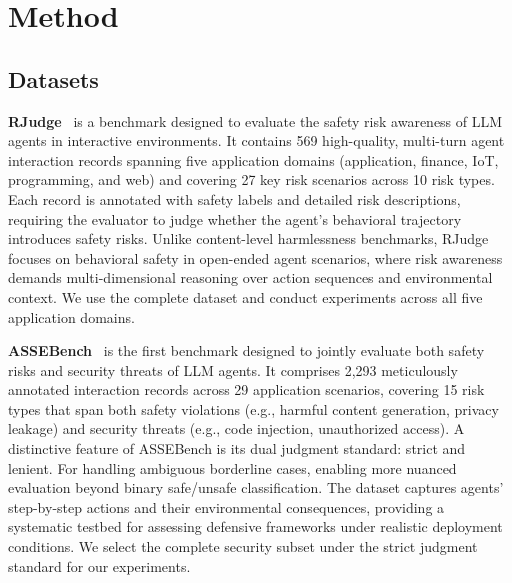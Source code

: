 \section{Method}
  \label{sec:method}
  \subsection{Datasets}
  \label{sec:datasets}
  \textbf{RJudge}~\citep{yuan2024rjudge} is a benchmark designed to evaluate the safety risk awareness of LLM agents in interactive environments. It contains 569 high-quality, multi-turn agent interaction records spanning five application domains (application, finance, IoT, programming, and web) and covering 27 key risk scenarios across 10 risk types. Each record is annotated with safety labels and detailed risk descriptions, requiring the evaluator to judge whether the agent's behavioral trajectory introduces safety risks. Unlike content-level harmlessness benchmarks, RJudge focuses on behavioral safety in open-ended agent scenarios, where risk awareness demands multi-dimensional reasoning over action sequences and environmental context. We use the complete dataset and conduct experiments across all five application domains.

  \noindent\textbf{ASSEBench}~\citep{luo2025agentauditor} is the first benchmark designed to jointly evaluate both safety risks and security threats of LLM agents. It comprises 2,293 meticulously annotated interaction records across 29 application scenarios, covering 15 risk types that span both safety violations (e.g., harmful content generation, privacy leakage) and security threats (e.g., code injection, unauthorized access). A distinctive feature of ASSEBench is its dual judgment standard: strict and lenient. For handling ambiguous borderline cases, enabling more nuanced evaluation beyond binary safe/unsafe classification. The dataset captures agents' step-by-step actions and their environmental consequences, providing a systematic testbed for assessing defensive frameworks under realistic deployment conditions. We select the complete security subset under the strict judgment standard for our experiments.

